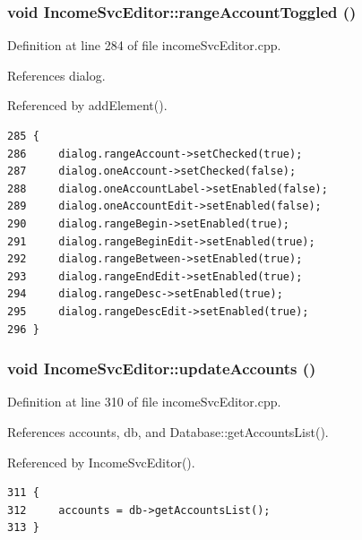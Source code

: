 \hypertarget{classIncomeSvcEditor_k5}{
\subsubsection[rangeAccountToggled]{\setlength{\rightskip}{0pt plus 5cm}void Income\-Svc\-Editor::range\-Account\-Toggled ()}}
\label{classIncomeSvcEditor_k5}


Definition at line 284 of file income\-Svc\-Editor.cpp.

References dialog.

Referenced by add\-Element().

\footnotesize\begin{verbatim}285 {
286     dialog.rangeAccount->setChecked(true);
287     dialog.oneAccount->setChecked(false);
288     dialog.oneAccountLabel->setEnabled(false);
289     dialog.oneAccountEdit->setEnabled(false);
290     dialog.rangeBegin->setEnabled(true);
291     dialog.rangeBeginEdit->setEnabled(true);
292     dialog.rangeBetween->setEnabled(true);
293     dialog.rangeEndEdit->setEnabled(true);
294     dialog.rangeDesc->setEnabled(true);
295     dialog.rangeDescEdit->setEnabled(true);
296 }
\end{verbatim}\normalsize 


\hypertarget{classIncomeSvcEditor_k6}{
\subsubsection[updateAccounts]{\setlength{\rightskip}{0pt plus 5cm}void Income\-Svc\-Editor::update\-Accounts ()}}
\label{classIncomeSvcEditor_k6}


Definition at line 310 of file income\-Svc\-Editor.cpp.

References accounts, db, and Database::get\-Accounts\-List().

Referenced by Income\-Svc\-Editor().

\footnotesize\begin{verbatim}311 {
312     accounts = db->getAccountsList();
313 }
\end{verbatim}\normalsize 


